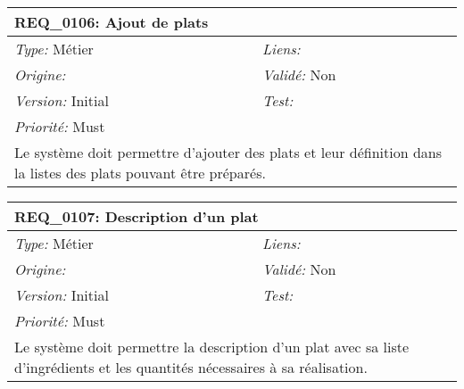 \begin{table}[!h]

\begin{tabular}{|p{60mm}p{100mm}|}

\hline

\multicolumn{2}{|l|}{\textbf{REQ\_0106:} Ajout de plats} \\ \hline

\emph{Type:} Métier & \emph{Liens:}  \\

\emph{Origine:}  & \emph{Validé:} Non \\

\emph{Version:} Initial & \emph{Test:}  \\

\emph{Priorité:} Must & \\ \hline

\multicolumn{2}{|p{16cm}|}{Le système doit permettre d'ajouter des plats et leur définition dans la listes des plats pouvant être préparés.} \\ \hline

\end{tabular}

\end{table}



\begin{table}[!h]

\begin{tabular}{|p{60mm}p{100mm}|}

\hline

\multicolumn{2}{|l|}{\textbf{REQ\_0107:} Description d'un plat} \\ \hline

\emph{Type:} Métier & \emph{Liens:}  \\

\emph{Origine:}  & \emph{Validé:} Non \\

\emph{Version:} Initial & \emph{Test:}  \\

\emph{Priorité:} Must & \\ \hline

\multicolumn{2}{|p{16cm}|}{Le système doit permettre la description d'un plat avec sa liste d'ingrédients et les quantités nécessaires à sa réalisation.} \\ \hline

\end{tabular}

\end{table}



